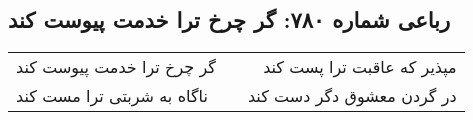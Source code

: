 \begin{center}
\section*{رباعی شماره ۷۸۰: گر چرخ ترا خدمت پیوست کند}
\label{sec:0780}
\begin{longtable}{l p{0.5cm} r}
گر چرخ ترا خدمت پیوست کند
&&
مپذیر که عاقبت ترا پست کند
\\
ناگاه به شربتی ترا مست کند
&&
در گردن معشوق دگر دست کند
\\
\end{longtable}
\end{center}
